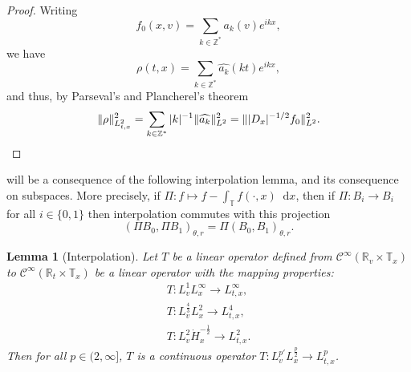 \documentclass[11pt,a4paper,reqno]{amsart}
\theoremstyle{plain}
\newtheorem{lemma}[theorem]{Lemma}
\theoremstyle{remark}
\newcommand{\dd}{\mathop{}\!\mathrm{d}}
\begin{document}
\begin{proof} 
Writing
\[
    f_0(x,v) = \sum_{k\in\mathbb{Z}^*} a_k(v) e^{ikx}, 
\]
we have
\[
    \rho(t,x) = \sum_{k \in \mathbb{Z}^*} \widehat{a_k}(kt) e^{ikx},
\]
and thus, by Parseval's and Plancherel's theorem
\[
    \| \rho \|_{L^2_{t,x}}^2 = \sum_{k\in\mathbb{Z}^*} |k|^{-1} \| \widehat{a_k} \|_{L^2}^2 = \| |D_x|^{-1/2} f_0 \|_{L^2}^2. \qedhere
\]
\end{proof}

 will be a consequence of the following interpolation lemma, and its consequence on subspaces. More precisely, if $\Pi : f \mapsto f - \int_{\mathbb{T}}f(\cdot, x)\dd x$, then if $\Pi : B_i \to B_i$ for all $i\in\{0,1\}$ then interpolation commutes with this projection \cite[Theorem 1.17.1.1]{Triebel1978}
\[
    (\Pi B_0, \Pi B_1)_{\theta, r} = \Pi (B_0,B_1)_{\theta,r}.
\]

\begin{lemma}[Interpolation] \label{lemmainterp} 
Let $T$ be a linear operator defined from $\mathcal{C}^{\infty}(\mathbb{R}_v \times \mathbb{T}_x)$ to $\mathcal{C}^{\infty}(\mathbb{R}_{t}\times \mathbb{T}_{x})$ be a linear operator with the mapping properties: 
\begin{align}
    T : L^1_vL^{\infty}_x \longrightarrow L^{\infty}_{t,x}, \label{eq.Linft-bound}\\ 
    T :  L^{\frac{4}{3}}_vL^{2}_x \longrightarrow L^{4}_{t,x}, \label{eq.L4-bound} \\ 
    T :  L^2_v\dot H^{-\frac{1}{2}}_x \longrightarrow L^{2}_{t,x}. \label{eq.L2-bound}
\end{align}
Then for all $p \in (2,\infty]$, $T$ is a continuous operator $T : L^{p'}_vL^{\frac{p}{2}}_x \longrightarrow L^p_{t,x}$.
\end{lemma}
\end{document}
